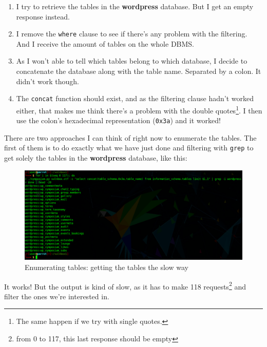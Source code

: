 \documentclass[12pt]{article}
\begin{document}
    \begin{enumerate}
        \item I try to retrieve the tables in the \textbf{wordpress} database.
            But I get an empty response instead.
        \item I remove the \texttt{where} clause to see if there's any problem
            with the filtering. And I receive the amount of tables on the whole
            DBMS.
        \item As I won't able to tell which tables belong to which database, I
            decide to concatenate the database along with the table name.
            Separated by a colon. It didn't work though.
        \item The \texttt{concat} function should exist, and as the filtering
            clause hadn't worked either, that makes me think there's a problem
            with the double quotes\footnote{The same happen if we try with
            single quotes.}.
            \newline
            I then use the colon's hexadecimal representation (\texttt{0x3a})
            and it worked!
    \end{enumerate}

    There are two approaches I can think of right now to enumerate the tables.
    The first of them is to do exactly what we have just done and filtering
    with \texttt{grep} to get solely the tables in the \textbf{wordpress}
    database, like this:

    \begin{figure}[H]\label{pic:28-exploit-tables-2}
        \centering
        \includegraphics[width=1.00\textwidth]{28-exploit-tables-2.png}
        \caption{Enumerating tables: getting the tables the slow way}
    \end{figure}

    It works! But the output is kind of slow, as it has to make 118 
    requests\footnote{from 0 to 117, this last response should be empty} and
    filter the ones we're interested in.
\end{document}
